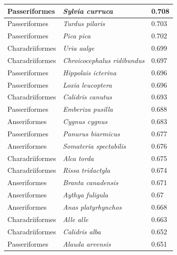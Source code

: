 \documentclass{article}
\begin{document}
\begin{longtable}{|p{} | p{} | p{} |}
  Passeriformes   & \textit{Sylvia curruca}                & 0.708                \\ \hline
  Passeriformes   & \textit{Turdus pilaris}                & 0.703                \\ \hline
  Passeriformes   & \textit{Pica pica}                     & 0.702                \\ \hline
  Charadriiformes & \textit{Uria aalge}                    & 0.699                \\ \hline
  Charadriiformes & \textit{Chroicocephalus ridibundus}    & 0.697                \\ \hline
  Passeriformes   & \textit{Hippolais icterina}            & 0.696                \\ \hline
  Passeriformes   & \textit{Loxia leucoptera}              & 0.696                \\ \hline
  Charadriiformes & \textit{Calidris canutus}              & 0.693                \\ \hline
  Passeriformes   & \textit{Emberiza pusilla}              & 0.688                \\ \hline
  Anseriformes    & \textit{Cygnus cygnus}                 & 0.683                \\ \hline
  Passeriformes   & \textit{Panurus biarmicus}             & 0.677                \\ \hline
  Anseriformes    & \textit{Somateria spectabilis}         & 0.676                \\ \hline
  Charadriiformes & \textit{Alca torda}                    & 0.675                \\ \hline
  Charadriiformes & \textit{Rissa tridactyla}              & 0.674                \\ \hline
  Anseriformes    & \textit{Branta canadensis}             & 0.671                \\ \hline
  Anseriformes    & \textit{Aythya fuligula}               & 0.67                 \\ \hline
  Anseriformes    & \textit{Anas platyrhynchos}            & 0.668                \\ \hline
  Charadriiformes & \textit{Alle alle}                     & 0.663                \\ \hline
  Charadriiformes & \textit{Calidris alba}                 & 0.652                \\ \hline
  Passeriformes   & \textit{Alauda arvensis}               & 0.651                \\ \hline

\end{longtable}
\end{document}
